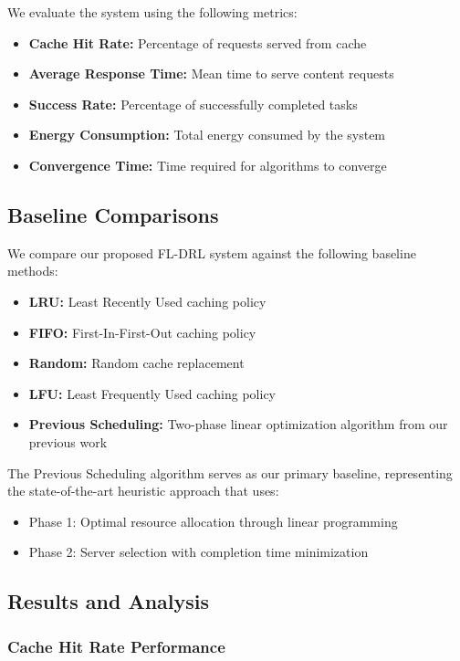 \documentclass[conference]{IEEEtran}
\begin{document}
We evaluate the system using the following metrics:

\begin{itemize}
\item \textbf{Cache Hit Rate:} Percentage of requests served from cache
\item \textbf{Average Response Time:} Mean time to serve content requests
\item \textbf{Success Rate:} Percentage of successfully completed tasks
\item \textbf{Energy Consumption:} Total energy consumed by the system
\item \textbf{Convergence Time:} Time required for algorithms to converge
\end{itemize}

\subsection{Baseline Comparisons}

We compare our proposed FL-DRL system against the following baseline methods:

\begin{itemize}
\item \textbf{LRU:} Least Recently Used caching policy
\item \textbf{FIFO:} First-In-First-Out caching policy
\item \textbf{Random:} Random cache replacement
\item \textbf{LFU:} Least Frequently Used caching policy
\item \textbf{Previous Scheduling:} Two-phase linear optimization algorithm from our previous work
\end{itemize}

The Previous Scheduling algorithm serves as our primary baseline, representing the state-of-the-art heuristic approach that uses:
\begin{itemize}
\item Phase 1: Optimal resource allocation through linear programming
\item Phase 2: Server selection with completion time minimization
\end{itemize}

\subsection{Results and Analysis}

\subsubsection{Cache Hit Rate Performance}
\end{document}
